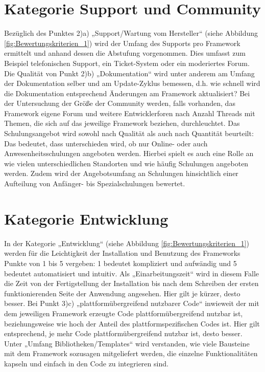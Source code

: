 \section{Kategorie Support und Community}

Bezüglich des Punktes 2)a) „Support/Wartung vom Hersteller“ (siehe Abbildung \ref{fig:Bewertungskriterien_1}) wird der Umfang des Supports pro Framework ermittelt und anhand dessen die Abstufung vorgenommen. Dies umfasst zum Beispiel telefonischen Support, ein Ticket-System oder ein moderiertes Forum. Die Qualität von Punkt 2)b) „Dokumentation“ wird unter anderem am Umfang der Dokumentation selber und am Update-Zyklus bemessen, d.h. wie schnell wird die Dokumentation entsprechend Änderungen am Framework aktualisiert? Bei der Untersuchung der Größe der Community werden, falls vorhanden, das Framework eigene Forum und weitere Entwicklerforen nach Anzahl Threads mit Themen, die sich auf das jeweilige Framework beziehen, durchleuchtet. Das Schulungsangebot wird sowohl nach Qualität als auch nach Quantität beurteilt: Das bedeutet, dass unterschieden wird, ob nur Online- oder auch Anwesenheitsschulungen angeboten werden. Hierbei spielt es auch eine Rolle an wie vielen unterschiedlichen Standorten und wie häufig Schulungen angeboten werden. Zudem wird der Angebotsumfang an Schulungen hinsichtlich einer Aufteilung von Anfänger- bis Spezialschulungen bewertet.

\section{Kategorie Entwicklung}

In der Kategorie „Entwicklung“ (siehe Abbildung \ref{fig:Bewertungskriterien_1}) werden für die Leichtigkeit der Installation und Benutzung des Frameworks Punkte von 1 bis 5 vergeben: 1 bedeutet kompliziert und aufwändig und 5 bedeutet automatisiert und intuitiv. Als „Einarbeitungszeit“ wird in diesem Falle die Zeit von der Fertigstellung der Installation bis nach dem Schreiben der ersten funktionierenden Seite der Anwendung angesehen. Hier gilt je kürzer, desto besser. Bei Punkt 3)c) „plattformübergreifend nutzbarer Code“ inwieweit der mit dem jeweiligen Framework erzeugte Code plattformübergreifend nutzbar ist, beziehungsweise wie hoch der Anteil des plattformspezifischen Codes ist. Hier gilt entsprechend, je mehr Code plattformübergreifend nutzbar ist, desto besser. Unter „Umfang Bibliotheken/Templates“ wird verstanden, wie viele Bausteine mit dem Framework sozusagen mitgeliefert werden, die einzelne Funktionalitäten kapseln und einfach in den Code zu integrieren sind.

